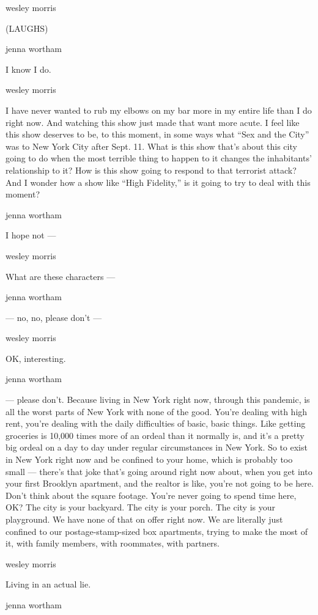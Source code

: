 wesley morris

(LAUGHS)

jenna wortham

I know I do.

wesley morris

I have never wanted to rub my elbows on my bar more in my entire life
than I do right now. And watching this show just made that want more
acute. I feel like this show deserves to be, to this moment, in some
ways what ``Sex and the City'' was to New York City after Sept. 11. What
is this show that's about this city going to do when the most terrible
thing to happen to it changes the inhabitants' relationship to it? How
is this show going to respond to that terrorist attack? And I wonder how
a show like ``High Fidelity,'' is it going to try to deal with this
moment?

jenna wortham

I hope not ---

wesley morris

What are these characters ---

jenna wortham

--- no, no, please don't ---

wesley morris

OK, interesting.

jenna wortham

--- please don't. Because living in New York right now, through this
pandemic, is all the worst parts of New York with none of the good.
You're dealing with high rent, you're dealing with the daily
difficulties of basic, basic things. Like getting groceries is 10,000
times more of an ordeal than it normally is, and it's a pretty big
ordeal on a day to day under regular circumstances in New York. So to
exist in New York right now and be confined to your home, which is
probably too small --- there's that joke that's going around right now
about, when you get into your first Brooklyn apartment, and the realtor
is like, you're not going to be here. Don't think about the square
footage. You're never going to spend time here, OK? The city is your
backyard. The city is your porch. The city is your playground. We have
none of that on offer right now. We are literally just confined to our
postage-stamp-sized box apartments, trying to make the most of it, with
family members, with roommates, with partners.

wesley morris

Living in an actual lie.

jenna wortham

